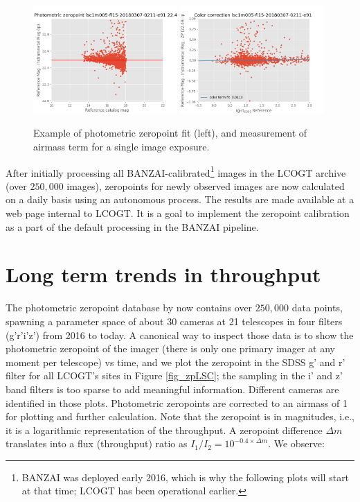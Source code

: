 \documentclass[]{spieman}
\begin{document}
\begin{figure}
\centering
\includegraphics[width=0.49\textwidth]{images/example_zeropointfit.png} \hspace*{\fill}
\includegraphics[width=0.49\textwidth]{images/example_colortermfit.png} \\[1ex]
\caption{\label{fig_singleimageexample}Example of photometric zeropoint fit (left), and measurement of
airmass term for a single image exposure.}
\end{figure}

After initially processing all BANZAI-calibrated\footnote{BANZAI was deployed early 2016, which 
is why the following plots will start at that time; LCOGT has been operational earlier.} images 
in the LCOGT archive (over $250,000$ images), zeropoints for newly observed  images are now 
calculated on a daily basis using an autonomous process. The results  
are made available at a web page internal to LCOGT. It is a goal to implement the zeropoint 
calibration as a part of the default processing in the BANZAI pipeline.


\section{Long term trends in throughput}

The photometric zeropoint database by now contains over $250,000$ data points, spawning a parameter
space of about 30 cameras at 21 telescopes in four filters (g'r'i'z') from 2016 to today. A
canonical way to inspect those data is to show the photometric zeropoint of the imager (there is
only one primary imager at any moment per telescope) vs time, and we plot the zeropoint in the SDSS
g' and r' filter for all LCOGT's sites in Figure \ref{fig_zpLSC}; the sampling in the i' and z'
band filters is too sparse to add meaningful information. Different cameras are identified in those
plots. Photometric zeropoints are corrected to an airmass of 1 for plotting and further calculation.
Note that the zeropoint is in magnitudes, i.e., it is a logarithmic representation of the
throughput. A zeropoint difference $\Delta m$ translates into a flux (throughput) ratio as $I_1 /
I_2 = 10^{-0.4 \times \Delta m}$.  We observe:
\end{document}
